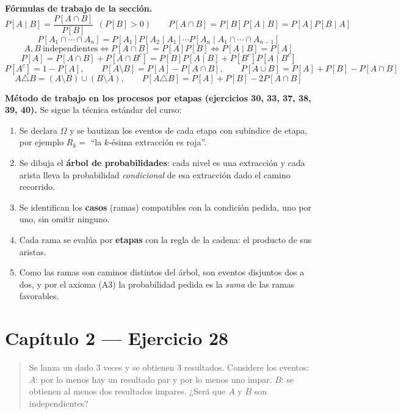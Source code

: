 \documentclass[11pt]{article}
\begin{document}
\begin{tip}
\textbf{F\'ormulas de trabajo de la secci\'on.}
\[
P[A\mid B]=\frac{P[A\cap B]}{P[B]}\ \ (P[B]>0)
\qquad
P[A\cap B]=P[B]P[A\mid B]=P[A]P[B\mid A]
\]
\[
P[A_1\cap\cdots\cap A_n]=P[A_1]P[A_2\mid A_1]\cdots P[A_n\mid A_1\cap\cdots\cap A_{n-1}]
\]
\[
A,B\ \text{independientes}\iff P[A\cap B]=P[A]P[B]\iff P[A\mid B]=P[A]
\]
\[
P[A]=P[A\cap B]+P[A\cap B^{c}]=P[B]P[A\mid B]+P[B^{c}]P[A\mid B^{c}]
\]
\[
P[A^{c}]=1-P[A],\qquad P[A\setminus B]=P[A]-P[A\cap B],\qquad P[A\cup B]=P[A]+P[B]-P[A\cap B]
\]
\[
A\triangle B=(A\setminus B)\cup(B\setminus A),\qquad
P[A\triangle B]=P[A]+P[B]-2P[A\cap B]
\]
\end{tip}

\begin{nota}
\textbf{M\'etodo de trabajo en los procesos por etapas (ejercicios 30, 33, 37, 38, 39, 40).} Se sigue la t\'ecnica est\'andar del curso:
\begin{enumerate}[leftmargin=*]
  \item Se declara $\Omega$ y se bautizan los eventos de cada etapa con sub\'indice de etapa, por ejemplo $R_k=$ ``la $k$-\'esima extracci\'on es roja''.
  \item Se dibuja el \textbf{\'arbol de probabilidades}: cada nivel es una extracci\'on y cada arista lleva la probabilidad \emph{condicional} de esa extracci\'on dado el camino recorrido.
  \item Se identifican los \textbf{casos} (ramas) compatibles con la condici\'on pedida, uno por uno, sin omitir ninguno.
  \item Cada rama se eval\'ua por \textbf{etapas} con la regla de la cadena: el producto de sus aristas.
  \item Como las ramas son caminos distintos del \'arbol, son eventos disjuntos dos a dos, y por el axioma (A3) la probabilidad pedida es la \emph{suma} de las ramas favorables.
\end{enumerate}
\end{nota}

\section*{Cap\'itulo 2 --- Ejercicio 28}

\begin{quote}
Se lanza un dado 3 veces y se obtienen 3 resultados. Considere los eventos: $A$: por lo menos hay un resultado par y por lo menos uno impar. $B$: se obtienen al menos dos resultados impares. ¿Ser\'a que $A$ y $B$ son independientes?
\end{quote}
\end{document}
